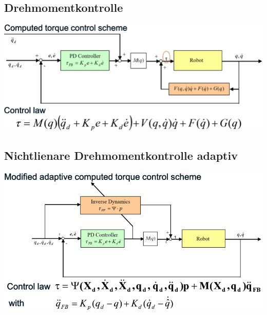 \begin{minipage}{0.5\linewidth}
    \subsection{Drehmomentkontrolle}
    \includegraphics[width=\linewidth]{./bilder/RegMod2}
\end{minipage}
\begin{minipage}{0.5\linewidth}
    \subsection{Nichtlienare Drehmomentkontrolle adaptiv}
    \includegraphics[width=\linewidth]{./bilder/RegModNL}
\end{minipage}

